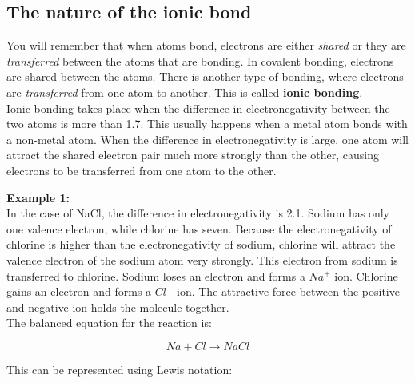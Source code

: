 \subsection{The nature of the ionic bond}

You will remember that when atoms bond, electrons are either \textit{shared} or they are \textit{transferred} between the atoms that are bonding. In covalent bonding, electrons are shared between the atoms. There is another type of bonding, where electrons are \textit{transferred} from one atom to another. This is called \textbf{ionic bonding}.\\

Ionic bonding takes place when the difference in electronegativity between the two atoms is more than 1.7. This usually happens when a metal atom bonds with a non-metal atom. When the difference in electronegativity is large, one atom will attract the shared electron pair much more strongly than the other, causing electrons to be transferred from one atom to the other.


\textbf{Example 1:}\\

In the case of NaCl, the difference in electronegativity is 2.1. Sodium has only one valence electron, while chlorine has seven. Because the electronegativity of chlorine is higher than the electronegativity of sodium, chlorine will attract the valence electron of the sodium atom very strongly. This electron from sodium is transferred to chlorine. Sodium loses an electron and forms a $Na^{+}$ ion. Chlorine gains an electron and forms a $Cl^{-}$ ion. The attractive force between the positive and negative ion holds the molecule together.\\

The balanced equation for the reaction is:

\begin{equation*}
Na + Cl \rightarrow NaCl
\end{equation*}

This can be represented using Lewis notation:

